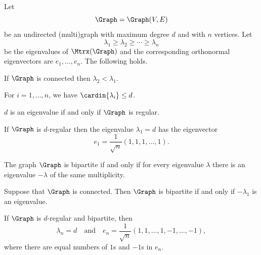 \begin{theorem}
    \hfill\break
    Let
    \[
    \Graph= \Graph(V,E)
    \]
    be an undirected (multi)graph with maximum degree $d$ and with $n$
    vertices.  Let
    \[
    \lambda_1\geq\lambda_2\geq \cdots \geq \lambda_n
    \]
    be the eigenvalues of $\Mtrx(\Graph)$ and the corresponding
    orthonormal eigenvectors are $e_1,\ldots, e_n$. The following
    holds.
    \begin{compactenumi}
        \item If $\Graph$ is connected then $\lambda_2 < \lambda_1$.

        \item For $i=1,\ldots, n$, we have
        $\cardin{\lambda_i} \leq d$.

        \item $d$ is an eigenvalue if and only if $\Graph$ is regular.

        \item If $\Graph$ is $d$-regular then the eigenvalue
        $\lambda_1=d$ has the eigenvector
        \[
        e_1 = \frac{1}{\sqrt{n}} (1,1,1, \ldots, 1).
        \]

        \item The graph $\Graph$ is bipartite if and only if for every
        eigenvalue $\lambda$ there is an eigenvalue $-\lambda$ of the
        same multiplicity.

        \item Suppose that $\Graph$ is connected. Then $\Graph$ is bipartite if
        and only if $-\lambda_1$ is an eigenvalue.

        \item If $\Graph$ is $d$-regular and bipartite, then
        \[
        \lambda_n = d
        \quad\text{and}\quad
        e_n=\frac{1}{\sqrt{n}} ( 1,1, \ldots, 1, -1, \ldots, -1),
        \]
        where there are equal numbers of $1$s and $-1$s in $e_n$.
    \end{compactenumi}
\end{theorem}
